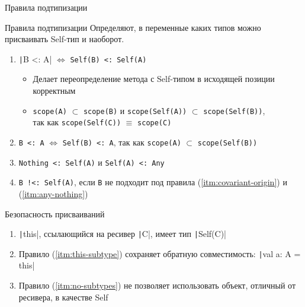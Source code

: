 \documentclass[handout,aspectratio=169,usenames,dvipsnames]{beamer}
\begin{document}
    \begin{frame}[fragile]{Правила подтипизации}
        \begin{block}{Правила подтипизации}
            Определяют, в переменные каких типов можно присваивать Self-тип и наоборот.
            \begin{enumerate}
                \item \label{itm:covariant-origin} \texttt|B <: A| $\iff$ \texttt{Self(B) <: Self(A)}
                \begin{itemize}
                    \item Делает переопределение метода с Self-типом в исходящей позиции корректным
                    \item \texttt{scope(A)} $\subset$ \texttt{scope(B)} и \texttt{scope(Self(A))} $\subset$ \texttt{scope(Self(B))},\\ так как \texttt{scope(Self(C))} $\equiv$ \texttt{scope(C)} \pause
                \end{itemize}
                \item \label{itm:this-subtype} \texttt{B <: A} $\iff$ \texttt{Self(B) <: A}, так как \texttt{scope(A)} $\subset$ \texttt{scope(Self(B))} \pause
                \item \label{itm:any-nothing} \texttt{Nothing <: Self(A)} и \texttt{Self(A) <: Any} \pause
                \item \label{itm:no-subtypes} \texttt{B  !<: Self(A)}, если \texttt{B} не подходит под правила (\ref{itm:covariant-origin}) и (\ref{itm:any-nothing})
            \end{enumerate}
        \end{block}
        \pause
        \begin{block}{Безопасность присваиваний}
            \begin{enumerate}
                \item \texttt|this|, ссылающийся на ресивер \texttt|C|, имеет тип \texttt|Self(C)|
                \item Правило (\ref{itm:this-subtype}) сохраняет обратную совместимость: \texttt|val a: A = this|
                \item Правило (\ref{itm:no-subtypes}) не позволяет использовать объект, отличный от ресивера, в качестве Self
            \end{enumerate}
        \end{block}
    \end{frame}
\end{document}
